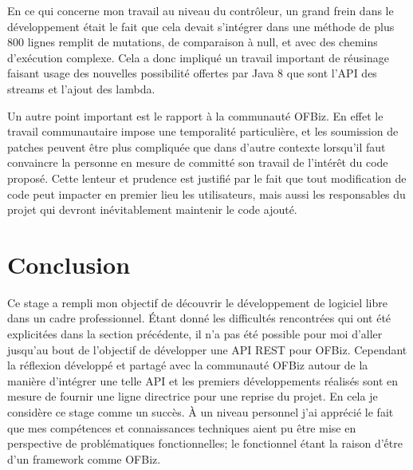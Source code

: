 \documentclass[a4paper, 11pt]{report}
\begin{document}
En ce qui concerne mon travail au niveau du contrôleur, un grand frein
dans le développement était le fait que cela devait s'intégrer dans
une méthode de plus 800 lignes remplit de mutations, de comparaison à
null, et avec des chemins d'exécution complexe. Cela a donc impliqué
un travail important de réusinage faisant usage des nouvelles
possibilité offertes par Java 8 que sont l'API des streams et l'ajout
des lambda.

Un autre point important est le rapport à la communauté OFBiz.  En
effet le travail communautaire impose une temporalité particulière, et
les soumission de patches peuvent être plus compliquée que dans
d'autre contexte lorsqu'il faut convaincre la personne en mesure de
committé son travail de l'intérêt du code proposé.  Cette lenteur et
prudence est justifié par le fait que tout modification de code peut
impacter en premier lieu les utilisateurs, mais aussi les responsables
du projet qui devront inévitablement maintenir le code ajouté.

\chapter{Conclusion}

Ce stage a rempli mon objectif de découvrir le développement de
logiciel libre dans un cadre professionnel. Étant donné les
difficultés rencontrées qui ont été explicitées dans la section
précédente, il n'a pas été possible pour moi d'aller jusqu'au bout de
l'objectif de développer une API REST pour OFBiz. Cependant la
réflexion développé et partagé avec la communauté OFBiz autour de la
manière d'intégrer une telle API et les premiers développements
réalisés sont en mesure de fournir une ligne directrice pour une
reprise du projet. En cela je considère ce stage comme un succès. À un
niveau personnel j'ai apprécié le fait que mes compétences et
connaissances techniques aient pu être mise en perspective de
problématiques fonctionnelles; le fonctionnel étant la raison d'ếtre
d'un framework comme OFBiz.

\clearpage



\end{document}
